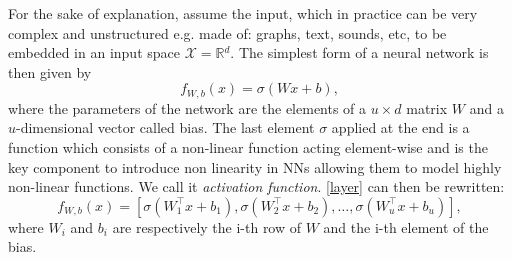 \documentclass[LaM,binding=0.6cm]{./packages/sapthesis/sapthesis}
\begin{document}
            For the sake of explanation, assume the input, which in practice can be very complex and unstructured e.g. made of: graphs, text, sounds, etc, to be embedded in an input space  $\mathcal{X} = \mathbb{R}{^d}$.
            The simplest form of a neural network is then given by
            \begin{equation}
                \label{layer}
                f_{W, b}\left(x\right) = \sigma(Wx + b),
            \end{equation}
            where the parameters of the network are the elements of a $u \times d$ matrix $ W $ and a $u$-dimensional vector called bias. The last element $ \sigma $ applied at the end is a
            function which consists of a non-linear function acting element-wise and is the key component to introduce non linearity in NNs allowing them to model 
            highly non-linear functions. We call it \textit{activation function}. \ref{layer} can then be rewritten:
            \begin{equation}
                f_{W, b}\left(x\right) = \left[\sigma(W_1^{\intercal} x + b_1), \sigma(W_2^{\intercal} x + b_2), \ldots, \sigma(W_u^{\intercal} x + b_u)\right],
            \end{equation}
            where $W_i$ and $b_i$ are respectively the i-th row of $W$ and the i-th element of the bias.
            
\end{document}

